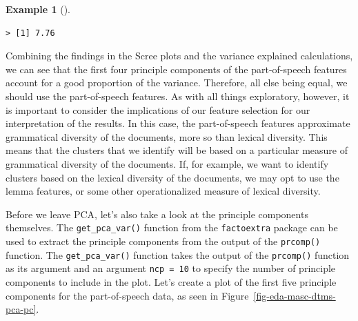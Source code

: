 \documentclass[
  letterpaper,
  DIV=11,
  numbers=noendperiod]{scrreport}
\newenvironment{Shaded}{\begin{snugshade}}{\end{snugshade}}
\newcommand{\CommentTok}[1]{\textcolor[rgb]{0.00,0.00,0.00}{\textit{#1}}}
\newcommand{\DecValTok}[1]{\textcolor[rgb]{0.00,0.00,0.00}{#1}}
\newcommand{\FunctionTok}[1]{\textcolor[rgb]{0.00,0.00,0.00}{#1}}
\newcommand{\NormalTok}[1]{\textcolor[rgb]{0.00,0.00,0.00}{#1}}
\newcommand{\OtherTok}[1]{\textcolor[rgb]{0.00,0.00,0.00}{#1}}
\newcommand{\SpecialCharTok}[1]{\textcolor[rgb]{0.00,0.00,0.00}{#1}}
\theoremstyle{definition}
\newtheorem{example}{Example}[chapter]
\theoremstyle{remark}
\begin{document}
\begin{example}[]
\begin{Shaded}
\end{Shaded}

\begin{verbatim}
> [1] 7.76
\end{verbatim}

\end{example}

Combining the findings in the Scree plots and the variance explained
calculations, we can see that the first four principle components of the
part-of-speech features account for a good proportion of the variance.
Therefore, all else being equal, we should use the part-of-speech
features. As with all things exploratory, however, it is important to
consider the implications of our feature selection for our
interpretation of the results. In this case, the part-of-speech features
approximate grammatical diversity of the documents, more so than lexical
diversity. This means that the clusters that we identify will be based
on a particular measure of grammatical diversity of the documents. If,
for example, we want to identify clusters based on the lexical diversity
of the documents, we may opt to use the lemma features, or some other
operationalized measure of lexical diversity.

Before we leave PCA, let's also take a look at the principle components
themselves. The \texttt{get\_pca\_var()} function from the
\texttt{factoextra} package can be used to extract the principle
components from the output of the \texttt{prcomp()} function. The
\texttt{get\_pca\_var()} function takes the output of the
\texttt{prcomp()} function as its argument and an argument
\texttt{ncp\ =\ 10} to specify the number of principle components to
include in the plot. Let's create a plot of the first five principle
components for the part-of-speech data, as seen in
Figure~\ref{fig-eda-masc-dtms-pca-pc}.
\end{document}
